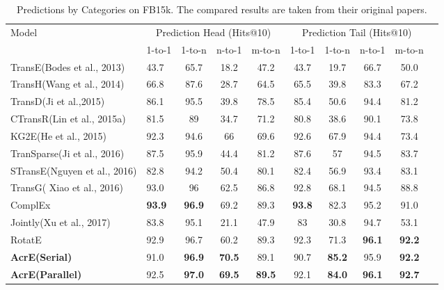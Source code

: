 \documentclass[11pt]{article}
\begin{document}
\begin{table}[t]
	\centering
\begin{tabular}{llcccccccc}
		\toprule
		\multirow{2}[2]{*}{Model} & \multicolumn{4}{c}{Prediction Head (Hits@10)} & \multicolumn{4}{c}{Prediction Tail (Hits@10)} \\
		\cmidrule{2-9}
		\multicolumn{1}{c}{} & \multicolumn{1}{c}{1-to-1} & \multicolumn{1}{c}{1-to-n} & \multicolumn{1}{c}{n-to-1} & \multicolumn{1}{c}{m-to-n} & \multicolumn{1}{c}{1-to-1} & \multicolumn{1}{c}{1-to-n} & \multicolumn{1}{c}{n-to-1} & \multicolumn{1}{c}{m-to-n} \\
		\midrule
		TransE(Bodes et al., 2013) & 43.7  & 65.7  & 18.2  & 47.2  & 43.7  & 19.7  & 66.7  & 50.0 \\
		TransH(Wang et al., 2014) & 66.8  & 87.6  & 28.7  & 64.5  & 65.5  & 39.8  & 83.3  & 67.2 \\
		TransD(Ji et al.,2015)  & 86.1  & 95.5  & 39.8  & 78.5  & 85.4  & 50.6  & 94.4  & 81.2 \\
		CTransR(Lin et al., 2015a) & 81.5  & 89    & 34.7  & 71.2  & 80.8  & 38.6  & 90.1  & 73.8 \\
		KG2E(He et al., 2015) & 92.3  & 94.6  & 66    & 69.6  & 92.6  & 67.9  & 94.4  & 73.4 \\
		TranSparse(Ji et al., 2016) & 87.5  & 95.9  & 44.4  & 81.2  & 87.6  & 57    & 94.5  & 83.7 \\
		STransE(Nguyen et al., 2016) & 82.8  & 94.2  & 50.4  & 80.1  & 82.4  & 56.9  & 93.4  & 83.1 \\
		TransG( Xiao et al., 2016) & {93.0} & 96    & 62.5  & 86.8  & {92.8} & 68.1  & 94.5  & {88.8} \\
		ComplEx\cite{Trouillon:2016} & {\bf 93.9}  & {\bf 96.9}  & 69.2  & 89.3  & {\bf 93.8}    & 82.3  & 95.2  & 91.0 \\
		Jointly(Xu et al., 2017) & 83.8  & 95.1  & 21.1  & 47.9  & 83    & 30.8  & 94.7  & 53.1 \\
		
		RotatE\cite{Sun:2019} & 92.9  & 96.7  & 60.2  & 89.3  & 92.3    & 71.3  & {\bf 96.1}  & {\bf 92.2} \\
		\midrule
		{\bf AcrE(Serial)} & {91.0}  & {\bf 96.9}  & {\bf 70.5}  & {89.1}  & {90.7}    & {\bf 85.2}  & {95.9}  & {\bf 92.2} \\
		{\bf AcrE(Parallel)} & {92.5}  & {\bf 97.0}  & {\bf 69.5}  & {\bf 89.5}  & {92.1}    & {\bf 84.0}  & {\bf 96.1}  & {\bf 92.7} \\
		
		\hline
	\end{tabular}\caption{Predictions by Categories on FB15k. The compared results are taken from their original papers.}
	\label{tab:detail2}\end{table}
\end{document}
